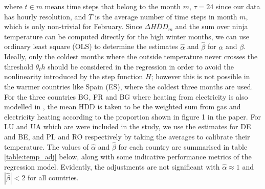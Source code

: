 \documentclass[12pt]{article}
\begin{document}
where $t\in m$ means time steps that belong to the month $m$, $\tau=24$ since our data has hourly resolution, and $\bar{T}$ is the average number of time steps in month $m$, which is only non-trivial for February. Since $\Delta \overline{HDD}_m$ and the sum over ninja temperature can be computed directly for the high winter months, we can use ordinary least square (OLS) to determine the estimates $\hat{\alpha}$ and $\hat{\beta}$ for $\alpha$ and $\beta$. Ideally, only the coldest months where the outside temperature never crosses the threshold $\theta_th$ should be considered in the regression in order to avoid the nonlinearity introduced by the step function $H$; however this is not possible in the warmer countries like Spain (ES), where the coldest three months are used. For the three countries BG, FR and BG where heating from electricity is also modelled in \cite{KOZARCANIN2019368}, the mean HDD is taken to be the weighted sum from gas and electricity heating according to the proportion shown in figure 1 in the paper. For LU and UA which are were included in the study, we use the estimates for DE and BE, and PL and RO respectively by taking the averages to calibrate their temperature. The values of $\hat{\alpha}$ and $\hat{\beta}$ for each country are summarised in table \ref{table:temp_adj} below, along with some indicative performance metrics of the regression model. Evidently, the adjustments are not significant with $\hat{\alpha} \approx 1$ and $|\hat{\beta}|<2$ for all countries. 
\end{document}
